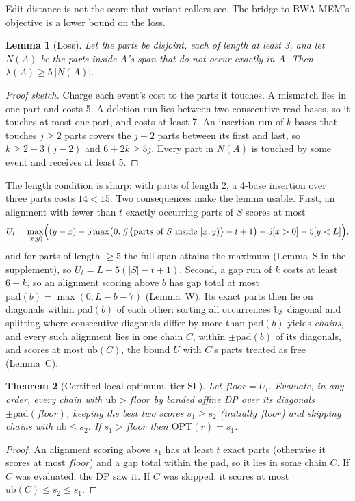 \documentclass[11pt]{article}
\newtheorem{theorem}{Theorem}
\newtheorem{lemma}[theorem]{Lemma}
\theoremstyle{definition}
\newcommand{\OPT}{\mathrm{OPT}}
\newcommand{\pad}{\mathrm{pad}}
\newcommand{\ub}{\mathrm{ub}}
\begin{document}
Edit distance is not the score that variant callers see. The bridge to
BWA-MEM's objective is a lower bound on the loss.

\begin{lemma}[Loss]\label{lem:L}
Let the parts be disjoint, each of length at least 3, and let $N(A)$ be
the parts inside $A$'s span that do not occur exactly in $A$. Then
$\lambda(A)\ge 5\,|N(A)|$.
\end{lemma}
\begin{proof}[Proof sketch]
Charge each event's cost to the parts it touches. A mismatch lies in one
part and costs 5. A deletion run lies between two consecutive read bases,
so it touches at most one part, and costs at least 7. An insertion run of
$k$ bases that touches $j\ge2$ parts covers the $j-2$ parts between its
first and last, so $k\ge 2+3(j-2)$ and $6+2k\ge 5j$. Every part in $N(A)$
is touched by some event and receives at least 5.
\end{proof}

The length condition is sharp: with parts of length 2, a 4-base insertion
over three parts costs $14<15$. Two consequences make the lemma usable.
First, an alignment with fewer than $t$ exactly occurring parts of $S$ scores at
most
\[
U_t = \max_{[x,y)} \Bigl( (y-x) - 5\max\bigl(0, \#\{\text{parts of } S
\text{ inside } [x,y)\} - t + 1\bigr) - 5[x>0] - 5[y<L] \Bigr),
\]
and for parts of length $\ge 5$ the full span attains the maximum
(Lemma~S in the supplement), so $U_t = L - 5(|S|-t+1)$. Second, a gap run
of $k$ costs at least $6+k$, so an alignment scoring above $b$ has gap
total at most $\pad(b)=\max(0, L-b-7)$ (Lemma~W). Its exact parts then lie
on diagonals within $\pad(b)$ of each other: sorting all occurrences by
diagonal and splitting where consecutive diagonals differ by more than
$\pad(b)$ yields \emph{chains}, and every such alignment lies in one chain
$C$, within $\pm\pad(b)$ of its diagonals, and scores at most $\ub(C)$, the
bound $U$ with $C$'s parts treated as free (Lemma~C).

\begin{theorem}[Certified local optimum, tier SL]\label{thm:L}
Let $\mathit{floor}=U_t$. Evaluate, in any order, every chain with
$\ub>\mathit{floor}$ by banded affine DP \citep{gotoh1982} over its
diagonals $\pm\pad(\mathit{floor})$, keeping the best two scores
$s_1\ge s_2$ (initially $\mathit{floor}$) and skipping chains with
$\ub\le s_2$. If $s_1>\mathit{floor}$ then $\OPT(r)=s_1$.
\end{theorem}
\begin{proof}
An alignment scoring above $s_1$ has at least $t$ exact parts (otherwise it
scores at most $\mathit{floor}$) and a gap total within the pad, so it
lies in some chain $C$. If $C$ was evaluated, the DP saw it. If $C$ was
skipped, it scores at most $\ub(C)\le s_2\le s_1$.
\end{proof}
\end{document}
